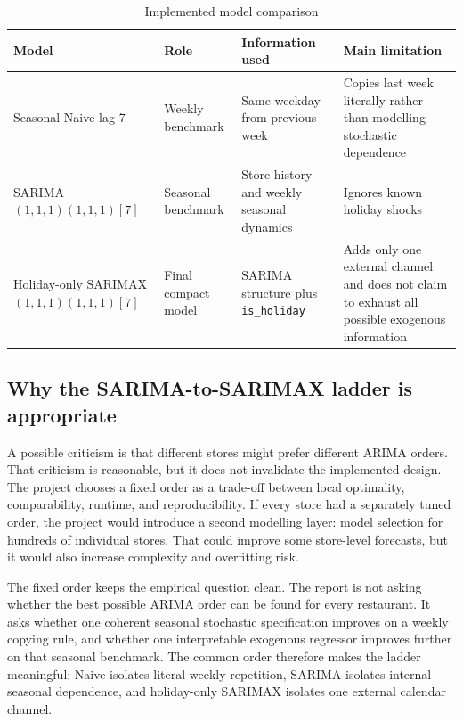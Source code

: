 \documentclass[11pt,oneside]{scrartcl}
\begin{document}
\begin{table}[H]
\centering
\caption{Implemented model comparison}
\begin{tabularx}{\textwidth}{>{\raggedright\arraybackslash}p{} >{\raggedright\arraybackslash}p{} >{\raggedright\arraybackslash}p{} >{\raggedright\arraybackslash}X}
\toprule
Model & Role & Information used & Main limitation \\
\midrule
Seasonal Naive lag 7 & Weekly benchmark & Same weekday from previous week & Copies last week literally rather than modelling stochastic dependence \\
SARIMA$(1,1,1)(1,1,1)[7]$ & Seasonal benchmark & Store history and weekly seasonal dynamics & Ignores known holiday shocks \\
Holiday-only SARIMAX$(1,1,1)(1,1,1)[7]$ & Final compact model & SARIMA structure plus \texttt{is\_holiday} & Adds only one external channel and does not claim to exhaust all possible exogenous information \\
\bottomrule
\end{tabularx}
\end{table}

\subsection{Why the SARIMA-to-SARIMAX ladder is appropriate}
A possible criticism is that different stores might prefer different ARIMA orders. That criticism is reasonable, but it does not invalidate the implemented design. The project chooses a fixed order as a trade-off between local optimality, comparability, runtime, and reproducibility. If every store had a separately tuned order, the project would introduce a second modelling layer: model selection for hundreds of individual stores. That could improve some store-level forecasts, but it would also increase complexity and overfitting risk.

The fixed order keeps the empirical question clean. The report is not asking whether the best possible ARIMA order can be found for every restaurant. It asks whether one coherent seasonal stochastic specification improves on a weekly copying rule, and whether one interpretable exogenous regressor improves further on that seasonal benchmark. The common order therefore makes the ladder meaningful: Naive isolates literal weekly repetition, SARIMA isolates internal seasonal dependence, and holiday-only SARIMAX isolates one external calendar channel.
\end{document}
